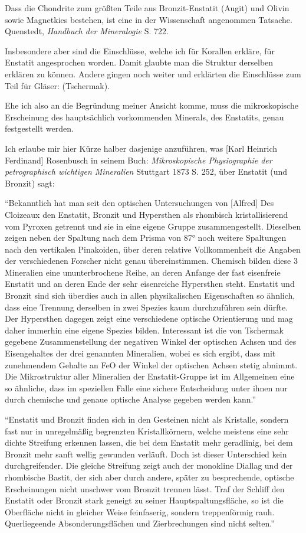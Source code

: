 \documentclass[a4paper, 12pt, oneside]{article}
\begin{document}
Dass die Chondrite zum größten Teile aus Bronzit-Enstatit (Augit) und Olivin sowie Magnetkies bestehen, ist eine in der Wissenschaft angenommen Tatsache. Quenstedt, \emph{Handbuch der Mineralogie} S. 722.

Insbesondere aber sind die Einschlüsse, welche ich für Korallen erkläre, für Enstatit angesprochen worden. Damit glaubte man die Struktur derselben erklären zu können. Andere gingen noch weiter und erklärten die Einschlüsse zum Teil für Gläser: (Tschermak).

Ehe ich also an die Begründung meiner Ansicht komme, muss die mikroskopische Erscheinung des hauptsächlich vorkommenden Minerals, des Enstatits, genau festgestellt werden.

Ich erlaube mir hier Kürze halber dasjenige anzuführen, was [Karl Heinrich Ferdinand] Rosenbusch in seinem Buch: \emph{Mikroskopische Physiographie der petrographisch wichtigen Mineralien} Stuttgart 1873 S. 252, über Enstatit (und Bronzit) sagt:

"`Bekanntlich hat man seit den optischen Untersuchungen von [Alfred] Des Cloizeaux den Enstatit, Bronzit und Hypersthen als rhombisch kristallisierend vom Pyroxen getrennt und sie in eine eigene Gruppe zusammengestellt. Dieselben zeigen neben der Spaltung nach dem Prisma von 87° noch weitere Spaltungen nach den vertikalen Pinakoiden, über deren relative Vollkommenheit die Angaben der verschiedenen Forscher nicht genau übereinstimmen. Chemisch bilden diese 3 Mineralien eine ununterbrochene Reihe, an deren Anfange der fast eisenfreie Enstatit und an deren Ende der sehr eisenreiche Hypersthen steht. Enstatit und Bronzit sind sich überdies auch in allen physikalischen Eigenschaften so ähnlich, dass eine Trennung derselben in zwei Spezies kaum durchzuführen sein dürfte. Der Hypersthen dagegen zeigt eine verschiedene optische Orientierung und mag daher immerhin eine eigene Spezies bilden. Interessant ist die von Tschermak gegebene Zusammenstellung der negativen Winkel der optischen Achsen und des Eisengehaltes der drei genannten Mineralien, wobei es sich ergibt, dass mit zunehmendem Gehalte an FeO der Winkel der optischen Achsen stetig abnimmt. Die Mikrostruktur aller Mineralien der Enstatit-Gruppe ist im Allgemeinen eine so ähnliche, dass im speziellen Falle eine sichere Entscheidung unter ihnen nur durch chemische und genaue optische Analyse gegeben werden kann."'

"`Enstatit und Bronzit finden sich in den Gesteinen nicht als Kristalle, sondern fast nur in unregelmäßig begrenzten Kristallkörnern, welche meistens eine sehr dichte Streifung erkennen lassen, die bei dem Enstatit mehr geradlinig, bei dem Bronzit mehr sanft wellig gewunden verläuft. Doch ist dieser Unterschied kein durchgreifender. Die gleiche Streifung zeigt auch der monokline Diallag und der rhombische Bastit, der sich aber durch andere, später zu besprechende, optische Erscheinungen nicht unschwer vom Bronzit trennen lässt. Traf der Schliff den Enstatit oder Bronzit stark geneigt zu seiner Hauptspaltungsfläche, so ist die Oberfläche nicht in gleicher Weise feinfaserig, sondern treppenförmig rauh. Querliegeende Absonderungsflächen und Zierbrechungen sind nicht selten."'
\end{document}
